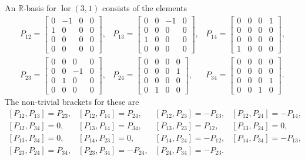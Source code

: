 \documentclass[10pt, letterpaper]{article}
\begin{document}
An $\mathbb{R}$-basis for $\operatorname{lor}(3,1)$ consists of the elements
$$
\begin{array}{lll}
P_{12}=\left[\begin{array}{cccc}
0 & -1 & 0 & 0 \\
1 & 0 & 0 & 0 \\
0 & 0 & 0 & 0 \\
0 & 0 & 0 & 0
\end{array}\right], & P_{13}=\left[\begin{array}{cccc}
0 & 0 & -1 & 0 \\
0 & 0 & 0 & 0 \\
1 & 0 & 0 & 0 \\
0 & 0 & 0 & 0
\end{array}\right], & P_{14}=\left[\begin{array}{llll}
0 & 0 & 0 & 1 \\
0 & 0 & 0 & 0 \\
0 & 0 & 0 & 0 \\
1 & 0 & 0 & 0
\end{array}\right], \\
P_{23}=\left[\begin{array}{cccc}
0 & 0 & 0 & 0 \\
0 & 0 & -1 & 0 \\
0 & 1 & 0 & 0 \\
0 & 0 & 0 & 0
\end{array}\right], & P_{24}=\left[\begin{array}{cccc}
0 & 0 & 0 & 0 \\
0 & 0 & 0 & 1 \\
0 & 0 & 0 & 0 \\
0 & 1 & 0 & 0
\end{array}\right], & P_{34}=\left[\begin{array}{llll}
0 & 0 & 0 & 0 \\
0 & 0 & 0 & 0 \\
0 & 0 & 0 & 1 \\
0 & 0 & 1 & 0
\end{array}\right] .
\end{array}
$$
The non-trivial brackets for these are
$$
\begin{array}{lllll}
{\left[P_{12}, P_{13}\right]=P_{23},} & {\left[P_{12}, P_{14}\right]=P_{24},} & {\left[P_{12}, P_{23}\right]=-P_{13},} & {\left[P_{12}, P_{24}\right]=-P_{14},} \\
{\left[P_{12}, P_{34}\right]=0,} & {\left[P_{13}, P_{14}\right]=P_{34},} & {\left[P_{13}, P_{23}\right]=P_{12},} & {\left[P_{13}, P_{24}\right]=0,} \\
{\left[P_{13}, P_{34}\right]=0,} & {\left[P_{14}, P_{23}\right]=0,} & {\left[P_{14}, P_{24}\right]=-P_{12},} & {\left[P_{14}, P_{34}\right]=-P_{13},} \\
{\left[P_{23}, P_{24}\right]=P_{34},} & {\left[P_{23}, P_{34}\right]=-P_{24},} & {\left[P_{24}, P_{34}\right]=-P_{23} .} &
\end{array}
$$
\end{document}
